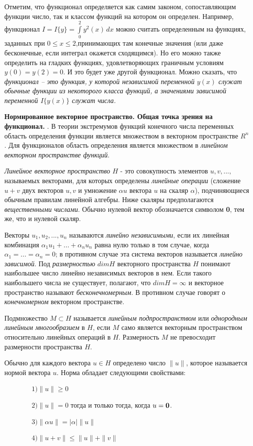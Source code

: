 Отметим, что функционал определяется как самим законом, сопоставляющим функции число, так и классом функций на котором он определен. Например, функционал $\displaystyle I = I\{y\} = \int\limits_0^2 y^2(x)\,dx$ можно считать определенным на функциях, заданных при $0\leq x\leq 2$,принимающих там конечные значения (или даже бесконечные, если интеграл окажется сходящимся). Но его можно также определить на гладких функциях, удовлетворяющих граничным условиям $y(0)=y(2)=0$. И это будет уже другой функционал. Можно сказать, что {\it функционал – это функция, у которой независимой переменной $y(x)$ служат обычные функции из некоторого класса функций, а значениями зависимой переменной $I\{y(x)\}$ служат числа.}

{\bf Нормированное векторное пространство. Общая точка зрения на функционал.} . В теории экстремумов функций конечного числа переменных область определения функции является множеством в векторном пространстве $R^n$. Для функционалов область определения является множеством в {\it линейном векторном пространстве функций}.

	\newpage
	\noindent
	{\it Линейное векторное пространство} $H$ - это совокупность элементов $u, v, ...,$ называемых векторами, для которых определены {\it линейные операции} (сложение $u+v$ двух векторов $u, v$ и умножение $\alpha u$ вектора $u$ на скаляр $\alpha$), подчиняющиеся обычным правилам линейной алгебры. Ниже скаляры предполагаются {\it вещественными числами}. Обычно нулевой вектор обозначается символом {\bf 0}, тем же, что и нулевой скаляр.

Векторы $u_1, u_2, ..., u_n$ называются {\it линейно независимыми}, если их линейная комбинация $\alpha_1 u_1+...+\alpha_n u_n$ равна нулю только в том случае, когда $\alpha_1=...=\alpha_n=0$; в противном случае эта система векторов называется {\it линейно зависимой}. Под {\it размерностью} $dimH$ векторного пространства $H$ понимают наибольшее число линейно независимых векторов в нем. Если такого наибольшего числа не существует, полагают, что $dimH=\infty$ и векторное пространство называют {\it бесконечномерным}. В противном случае говорят о {\it конечномерном} векторном пространстве.

Подмножество $M\subset H$ называется {\it линейным подпространством} или {\it однородным линейным многообразием} в $H$, если $M$ само является векторным пространством относительно линейных операций в $H$. Размерность $M$ не превосходит размерности пространства $H$.

Обычно для каждого вектора $u\in H$ определено число $\| u \| $, которое называется нормой вектора $u$. Норма обладает следующими свойствами:
\begin{flushleft}
	$\mspace{72mu}1)\| u \|\ge0 $

	$\mspace{72mu}2)\| u \|=0 $ тогда и только тогда, когда $u={\bf 0}$.

	$\mspace{72mu}3)\| \alpha u \|= |\alpha | \| u \|$

	$\mspace{72mu}4)\| u+v \|\le \| u \|+\| v \| $
\end{flushleft}

